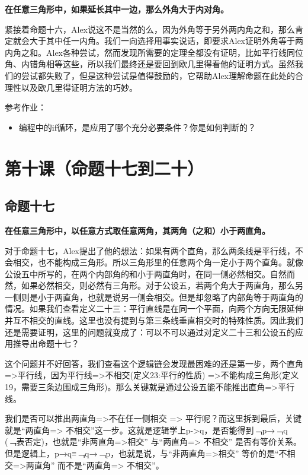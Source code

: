 \documentclass[
]{book}
\providecommand{\tightlist}{%
  \setlength{\itemsep}{0pt}\setlength{\parskip}{0pt}}
\begin{document}
\textbf{在任意三角形中，如果延长其中一边，那么外角大于内对角。}

紧接着命题十六，Alex说这不是当然的么，因为外角等于另外两内角之和，那么肯定就会大于其中任一内角。我们一向选择用事实说话，即要求Alex证明外角等于两内角之和。Alex各种尝试，然而发现所需要的定理全都没有证明，比如平行线同位角、内错角相等这些，所以我们最终还是要回到欧几里得看他的证明方式。虽然我们的尝试都失败了，但是这种尝试是值得鼓励的，它帮助Alex理解命题在此处的合理性以及欧几里得证明方法的巧妙。

参考作业：

\begin{itemize}
\tightlist
\item
  编程中的if循环，是应用了哪个充分必要条件？你是如何判断的？
\end{itemize}

\hypertarget{ux7b2cux5341ux8bfeux547dux9898ux5341ux4e03ux5230ux4e8cux5341}{%
\chapter{第十课（命题十七到二十）}\label{ux7b2cux5341ux8bfeux547dux9898ux5341ux4e03ux5230ux4e8cux5341}}

\hypertarget{ux547dux9898ux5341ux4e03}{%
\section{命题十七}\label{ux547dux9898ux5341ux4e03}}

\textbf{在任意三角形中，以任意方式取任意两角，其两角（之和）小于两直角。}

对于命题十七，Alex提出了他的想法：如果有两个直角，那么两条线是平行线，不会相交，也不能构成三角形。所以三角形里的任意两个角一定小于两个直角。就像公设五中所写的，在两个内部角的和小于两直角时，在同一侧必然相交。自然而然，如果必然相交，则必然有三角形。对于公设五，若两个角大于两直角，那么另一侧则是小于两直角，也就是说另一侧会相交。但是却忽略了内部角等于两直角的情况。如果我们查看定义二十三：平行直线是在同一个平面，向两个方向无限延伸并互不相交的直线。这里也没有提到与第三条线垂直相交时的特殊性质。因此我们还是需要证明，这里的问题就变成了：可以不可以通过对定义二十三和公设五的应用推导出命题十七？

这个问题并不好回答，我们查看这个逻辑链会发现最困难的还是第一步，两个直角=\textgreater 平行线，因为平行线=\textgreater 不相交(定义23:平行的性质) =\textgreater 不能构成三角形(定义19，需要三条边围成三角形)。那么关键就是通过公设五能不能推出直角=\textgreater 平行线。

我们是否可以推出两直角=\textgreater 不在任一侧相交 =\textgreater{} 平行呢？而这里拆到最后，关键就是``两直角=\textgreater{} 不相交''这一步。这就是逻辑学上p-\textgreater q，是否能得到﹁p→﹁q (﹁表否定)，也就是``非两直角=\textgreater 相交'' 与``两直角=\textgreater{} 不相交'' 是否有等价关系。但是逻辑上，p→q≡﹁q→﹁p，也就是说，与``非两直角=\textgreater 相交'' 等价的是``不相交=\textgreater 两直角'' 而不是``两直角=\textgreater{} 不相交''。
\end{document}
